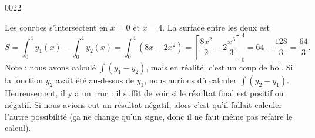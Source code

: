 \begin{corrige}{0022}

Les courbes s'intersectent en $x=0$ et $x=4$. La surface entre les deux est
\begin{equation}
	S=\int_0^4y_1(x)-\int_0^4y_2(x)=\int_0^4(8x-2x^2)=\left[ \frac{ 8x^2 }{ 2 }-2\frac{ x^3 }{ 3 } \right]_0^4=64-\frac{ 128 }{ 3 }=\frac{ 64 }{ 3 }.
\end{equation}
Note : nous avons calculé $\int(y_1-y_2)$, mais en réalité, c'est un coup de bol. Si la fonction $y_2$ avait été au-dessus de $y_1$, nous aurions dû calculer $\int(y_2-y_1)$. Heureusement, il y a un truc : il suffit de voir si le résultat final est positif ou négatif. Si nous avions eut un résultat négatif, alors c'est qu'il fallait calculer l'autre possibilité (ça ne change qu'un signe, donc il ne faut même pas refaire le calcul).

\end{corrige}
